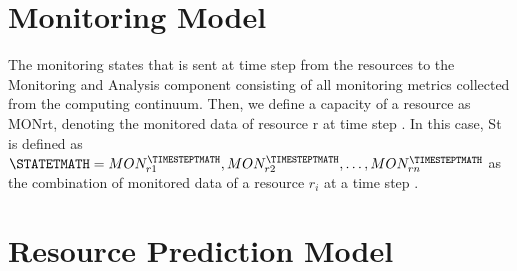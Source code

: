 




    \section{Monitoring Model}
    \label{sec:monitoring-model}

        The monitoring states \STATET that is sent at time step \TIMESTEPT from the resources to the Monitoring and Analysis component consisting of all monitoring metrics collected from the computing continuum. 
        Then, we define a capacity of a resource as MONrt, denoting the monitored data of resource r at time step \TIMESTEPT. 
        In this case, St is defined as $\STATETMATH = {MON_{r1}^\TIMESTEPTMATH, MON_{r2}^\TIMESTEPTMATH, \dots, MON_{rn}^\TIMESTEPTMATH}$ as the combination of monitored data of a resource $r_i$ at a time step \TIMESTEPT.

        
    \section{Resource Prediction Model}
    \label{sec:resource-prediction-model}

